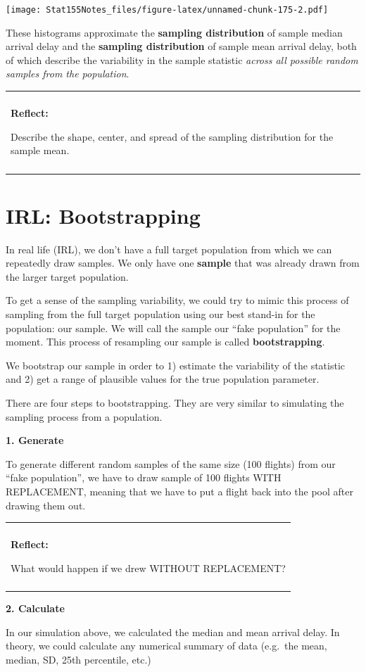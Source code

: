 \documentclass[]{book}
\newenvironment{reflect}
{
    \begin{center}
    
    \begin{tabular}{|p{0.8\textwidth}|}
    \rowcolor{LightBlue}
    \hline\\
    \rowcolor{LightBlue}
    \textbf{Reflect:}
}
{
    \\\rowcolor{LightBlue}
    \\\hline
    \end{tabular} 
    \end{center}
}
\begin{document}
\texttt{[image: Stat155Notes\_files/figure-latex/unnamed-chunk-175-2.pdf]}

These histograms approximate the \textbf{sampling distribution} of sample median arrival delay and the \textbf{sampling distribution} of sample mean arrival delay, both of which describe the variability in the sample statistic \emph{across all possible random samples from the population}.

\begin{reflect}
Describe the shape, center, and spread of the sampling distribution for
the sample mean.
\end{reflect}

\hypertarget{irl-bootstrapping}{%
\section{IRL: Bootstrapping}\label{irl-bootstrapping}}

In real life (IRL), we don't have a full target population from which we can repeatedly draw samples. We only have one \textbf{sample} that was already drawn from the larger target population.

To get a sense of the sampling variability, we could try to mimic this process of sampling from the full target population using our best stand-in for the population: our sample. We will call the sample our ``fake population'' for the moment. This process of resampling our sample is called \textbf{bootstrapping}.

We bootstrap our sample in order to 1) estimate the variability of the statistic and 2) get a range of plausible values for the true population parameter.

There are four steps to bootstrapping. They are very similar to simulating the sampling process from a population.

\textbf{1. Generate}

To generate different random samples of the same size (100 flights) from our ``fake population'', we have to draw sample of 100 flights WITH REPLACEMENT, meaning that we have to put a flight back into the pool after drawing them out.

\begin{reflect}
What would happen if we drew WITHOUT REPLACEMENT?
\end{reflect}

\textbf{2. Calculate}

In our simulation above, we calculated the median and mean arrival delay. In theory, we could calculate any numerical summary of data (e.g.~the mean, median, SD, 25th percentile, etc.)
\end{document}
